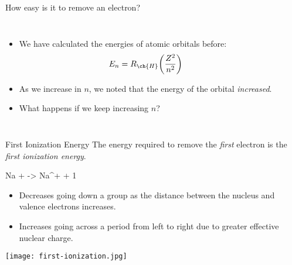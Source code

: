 \documentclass[notes=hide]{beamer}
\begin{document}
\begin{frame}{How easy is it to remove an electron?}
	\begin{columns}
		\begin{itemize}[<+->]
			\item We have calculated the energies of atomic orbitals
				before:
				\begin{equation*}
					E_n = R_{\ch{H}} \bigg( \frac{Z^2}{n^2} \bigg)
				\end{equation*}
			\item As we increase in $n$, we noted that the energy of
				the orbital \emph{increased}.
			\item What happens if we keep increasing $n$?
		\end{itemize}
	\end{columns}

\end{frame}

\begin{frame}[allowframebreaks]{First Ionization Energy}
	The energy required to remove the \emph{first} electron is the
	\emph{first ionization energy}.

	\begin{reaction*}
		Na\gas{} +  -> Na^{+}\gas{} + 1 \el
	\end{reaction*}
		
	\begin{itemize}
		\item Decreases going down a group as the distance between the
			nucleus and valence electrons increases.
		\item Increases going across a period from left to right due to
			greater effective nuclear charge.
	\end{itemize}

	\framebreak

	\begin{center}
		\texttt{[image: first-ionization.jpg]}
	\end{center}
\end{frame}
\end{document}
